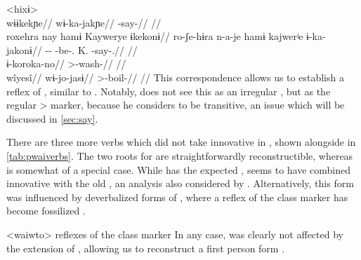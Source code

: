 \pex<hixɨ>
 \waiwai \parencite[][71]{waiwaihawkins1998}\\
\begingl
\glpreamble wɨɨkekɲe//
\gla wɨ-ka-jakɲe//
\glb {}-say-//
\glft {}//
\endgl
{} \hixka \parencite[][124]{hixkaryanaderby1985}\\
\begingl
\glpreamble roxehra nay hamɨ Kaywerye ɨkekonɨ//
\gla ro-ʃe-hɨra n-a-je hamɨ kajwerʲe ɨ-ka-jakonɨ//
\glb {}-- -be-.  K. -say-.//
\glft {}//
\endgl
{} \hixka \parencite[][191]{hixkaryanaderby1985}\\
\begingl
\gla ɨ-koroka-no//
\glb {}>-wash-//
\glft {}//
\endgl
{} \waiwai \parencite[][192]{waiwaihawkins1998}\\
\begingl
\glpreamble wîyesî//
\gla wɨ-jo-jasɨ//
\glb {}>-boil-//
\glft {}//
\endgl
\xe
%
This correspondence allows us to establish \hixka {} a reflex of , similar to \ikpeng {}.
Notably, \textcite{hixkaryanaderby1985} does not see this  as an irregular , but as the regular > marker, because he considers \hixka {}  to be transitive, an issue which will be discussed in \cref{sec:say}.

There are three more verbs which did not take innovative  in \PWai, shown alongside   in \cref{tab:pwaiverbs}.
The two roots for  are straightforwardly reconstructible, whereas  is somewhat of a special case.
While \hixka has the expected , \waiwai seems to have combined innovative  with the old , an analysis also considered by \textcite[90]{gildea1998}.
Alternatively, this form was influenced by deverbalized forms of , where a reflex of the  class marker  has become fossilized .

\pex<waiwto> \waiwai reflexes of the  class marker 
\a {}  \parencite[92]{waiwaihawkins1998}
\a {}  \parencite[165]{waiwaihawkins1998}
\a {}  \parencite[204]{waiwaihawkins1998}
\xe
%
In any case, \hixka {} was clearly not affected by the extension of , allowing us to reconstruct a \PWai first person form .




